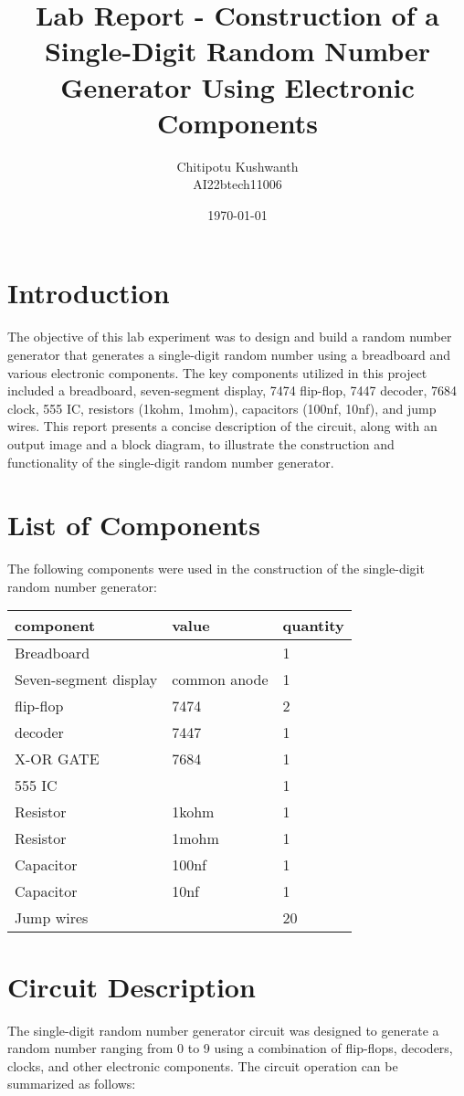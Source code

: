 \documentclass[journal,12pt,onecolumn]{IEEEtran}
\title{Lab Report - Construction of a Single-Digit Random Number Generator Using Electronic Components}
\author{Chitipotu Kushwanth\\AI22btech11006}
\date{\today}
\theoremstyle{remark}
\begin{document}
\maketitle

\section{Introduction}
The objective of this lab experiment was to design and build a random number generator that generates a single-digit random number using a breadboard and various electronic components. The key components utilized in this project included a breadboard, seven-segment display, 7474 flip-flop, 7447 decoder, 7684 clock, 555 IC, resistors (1kohm, 1mohm), capacitors (100nf, 10nf), and jump wires. This report presents a concise description of the circuit, along with an output image and a block diagram, to illustrate the construction and functionality of the single-digit random number generator.

\section{List of Components}
The following components were used in the construction of the single-digit random number generator:\\
\begin{tabular}{|l|l|l|}
\hline
component&value&quantity\\
\hline
Breadboard & & 1\\
\hline
Seven-segment display& common anode& 1\\
\hline
 flip-flop& 7474 &2\\
 \hline
 decoder& 7447 &1\\
 \hline
X-OR GATE& 7684 &1 \\
\hline
555 IC& &1\\
\hline
 Resistor& 1kohm &1\\
 \hline
 Resistor& 1mohm &1\\
 \hline
 Capacitor& 100nf &1\\
 \hline
 Capacitor&10nf &1\\
 \hline
 Jump wires& &20\\
 \hline
\end{tabular}
   
\section{Circuit Description}
The single-digit random number generator circuit was designed to generate a random number ranging from 0 to 9 using a combination of flip-flops, decoders, clocks, and other electronic components. The circuit operation can be summarized as follows:
\end{document}
